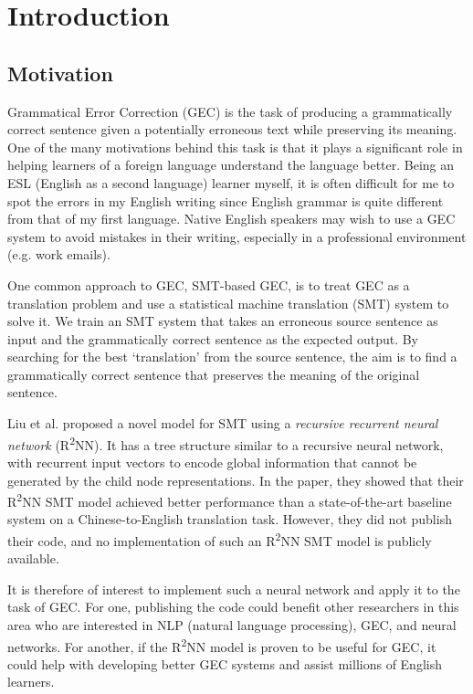\documentclass[12pt,a4paper,twoside,openright]{report}
\begin{document}
\chapter{Introduction}

\section{Motivation}

Grammatical Error Correction (GEC) is the task of producing a grammatically correct sentence given a potentially erroneous text while preserving its meaning. One of the many motivations behind this task is that it plays a significant role in helping learners of a foreign language understand the language better. Being an ESL (English as a second language) learner myself, it is often difficult for me to spot the errors in my English writing since English grammar is quite different from that of my first language. Native English speakers may wish to use a GEC system to avoid mistakes in their writing, especially in a professional environment (e.g. work emails). 

One common approach to GEC, SMT-based GEC, is to treat GEC as a translation problem and use a statistical machine translation (SMT) system to solve it. We train an SMT system that takes an erroneous source sentence as input and the grammatically correct sentence as the expected output. By searching for the best `translation' from the source sentence, the aim is to find a grammatically correct sentence that preserves the meaning of the original sentence.

Liu et al. proposed a novel model for SMT using a \textit{recursive recurrent neural network} (R\textsuperscript{2}NN)\cite{r2nn}. It has a tree structure similar to a recursive neural network, with recurrent input vectors to encode global information that cannot be generated by the child node representations. In the paper, they showed that their R\textsuperscript{2}NN SMT model achieved better performance than a state-of-the-art baseline system on a Chinese-to-English translation task. However, they did not publish their code, and no implementation of such an R\textsuperscript{2}NN SMT model is publicly available.

It is therefore of interest to implement such a neural network and apply it to the task of GEC. For one, publishing the code could benefit other researchers in this area who are interested in NLP (natural language processing), GEC, and neural networks. For another, if the R\textsuperscript{2}NN model is proven to be useful for GEC, it could help with developing better GEC systems and assist millions of English learners.
\end{document}
